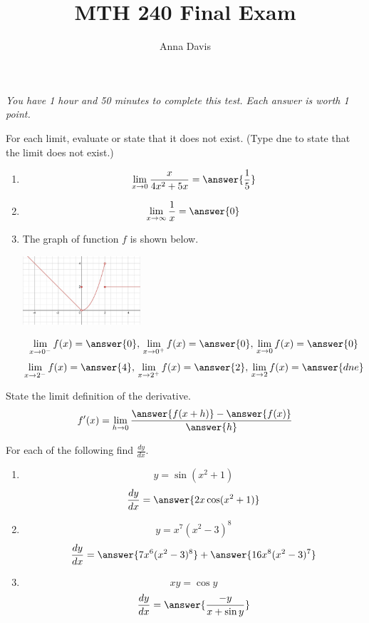 \documentclass{ximera}
\author{Anna Davis} \title{MTH 240 Final Exam}
\begin{document}
\begin{abstract}

\end{abstract}
\maketitle
 \textit{You have 1 hour and 50 minutes to complete this test.  Each answer is worth 1 point.}
\begin{problem}\label{prob:mth240finalprob1}
For each limit, evaluate or state that it does not exist.  (Type dne to state that the limit does not exist.)
  \begin{enumerate}
\item
$$\lim_{x\rightarrow 0} \frac{x}{4x^2+5x}=\answer{\frac{1}{5}}$$

\item
$$\lim_{x\rightarrow \infty} \frac{1}{x}=\answer{0}$$
\item The graph of function $f$ is shown below.
\begin{image}
   
\includegraphics[height=1in]{240finalimage1.jpg}

\end{image}

$$\lim_{x\rightarrow 0^-}f(x)=\answer{0},\,\lim_{x\rightarrow 0^+}f(x)=\answer{0},\,\lim_{x\rightarrow 0}f(x)=\answer{0}$$
$$\lim_{x\rightarrow 2^-}f(x)=\answer{4},\,\lim_{x\rightarrow 2^+}f(x)=\answer{2},\,\lim_{x\rightarrow 2}f(x)=\answer{dne}$$

  \end{enumerate}
\end{problem}

\begin{problem}\label{prob:mth240finalprob2}
State the limit definition of the derivative.
$$f'(x)=\lim_{h\rightarrow 0}\frac{\answer{f(x+h)}-\answer{f(x)}}{\answer{h}}$$
\end{problem}

\begin{problem}\label{prob:mth240finalprob3}
For each of the following find $\frac{dy}{dx}$.
  \begin{enumerate}
\item
$$y=\sin (x^2+1)$$
$$\frac{dy}{dx}=\answer{2x\cos(x^2+1)}$$

\item
$$y=x^7(x^2-3)^8$$
$$\frac{dy}{dx}=\answer{7x^6(x^2-3)^8}+\answer{16x^8(x^2-3)^7}$$

\item
$$xy=\cos y$$
$$\frac{dy}{dx}=\answer{\frac{-y}{x+\sin y}}$$
  \end{enumerate}
\end{problem}
\end{document}
